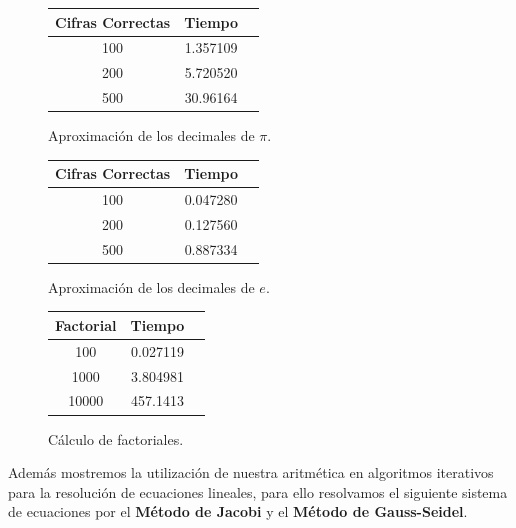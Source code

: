 \documentclass[a4paper,10pt,twocolumn]{article}
\begin{document}
	\begin{figure}[h!]%
		\begin{center}
			\begin{tabular}{|c|c|c|} \hline
			 	Cifras Correctas & Tiempo 	\\ \hline
			    100              &  1.357109 \\ \hline  
			    200              &  5.720520  \\ \hline
				500              &  30.96164  \\ \hline

\end{tabular}
		\caption{Aproximación de los decimales de $\pi$. \label{fig:ex}}
		\end{center}
	\end{figure}
	
	\begin{figure}[h!]%
		\begin{center}
			\begin{tabular}{|c|c|c|} \hline
			 	Cifras Correctas & Tiempo 	\\ \hline
			    100              &  0.047280 \\ \hline  
			    200              &  0.127560  \\ \hline
				500              &  0.887334  \\ \hline

\end{tabular}
		\caption{Aproximación de los decimales de $e$. \label{fig:ex}}
		\end{center}
	\end{figure}
	
	\begin{figure}[h!]%
		\begin{center}
			\begin{tabular}{|c|c|c|} \hline
			 	Factorial & Tiempo 	\\ \hline
			    100              &  0.027119 \\ \hline  
			    1000             &  3.804981  \\ \hline
				10000            &  457.1413  \\ \hline
		
\end{tabular}
		\caption{Cálculo de factoriales. \label{fig:ex}}
		\end{center}
	\end{figure}
	
	Además mostremos la utilización de nuestra aritmética en algoritmos iterativos para la resolución de ecuaciones lineales, para ello resolvamos el siguiente sistema de ecuaciones por el \textbf{Método de Jacobi} y el \textbf{Método de Gauss-Seidel}.
	
\end{document}
